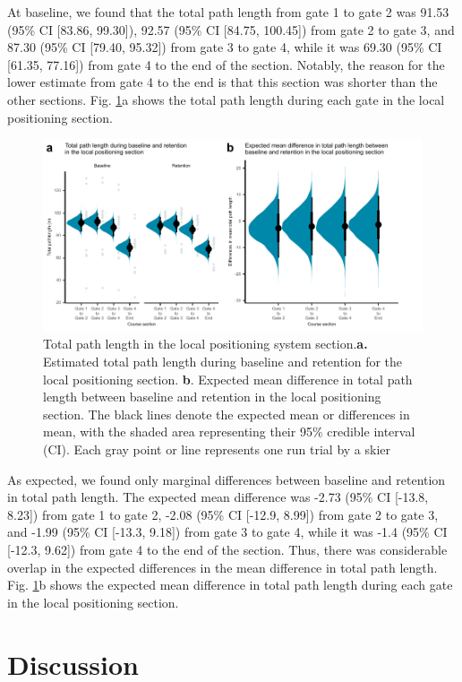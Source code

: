 \documentclass{article}
\begin{document}
At baseline, we found that the total path length from gate 1 to gate 2 was 91.53 (95\% CI [83.86, 99.30]), 92.57 (95\% CI [84.75, 100.45]) from gate 2 to gate 3, and 87.30 (95\% CI [79.40, 95.32]) from gate 3 to gate 4, while it was 69.30 (95\% CI [61.35, 77.16]) from gate 4 to the end of the section. Notably, the reason for the lower estimate from gate 4 to the end is that this section was shorter than the other sections. Fig. \ref{fig: path}a shows the total path length during each gate in the local positioning section.

\begin{figure}[H]
\centering
\includegraphics{figurer/figure_path.pdf}
\caption{Total path length in the local positioning system section.\textbf{a.} Estimated total path length during baseline and retention for the local positioning section. \textbf{b}. Expected mean difference in total path length between baseline and retention in the local positioning section. The black lines denote the expected mean or differences in mean, with the shaded area representing their 95\% credible interval (CI). Each gray point or line represents one run trial by a skier}\label{fig: path}
\end{figure}

As expected, we found only marginal differences between baseline and retention in total path length. The expected mean difference was -2.73 (95\% CI [-13.8, 8.23]) from gate 1 to gate 2, -2.08 (95\% CI [-12.9, 8.99]) from gate 2 to gate 3, and -1.99 (95\% CI [-13.3, 9.18]) from gate 3 to gate 4, while it was -1.4 (95\% CI [-12.3, 9.62]) from gate 4 to the end of the section. Thus, there was considerable overlap in the expected differences in the mean difference in total path length. Fig. \ref{fig: path}b shows the expected mean difference in total path length during each gate in the local positioning section.

\section{Discussion}
\end{document}
